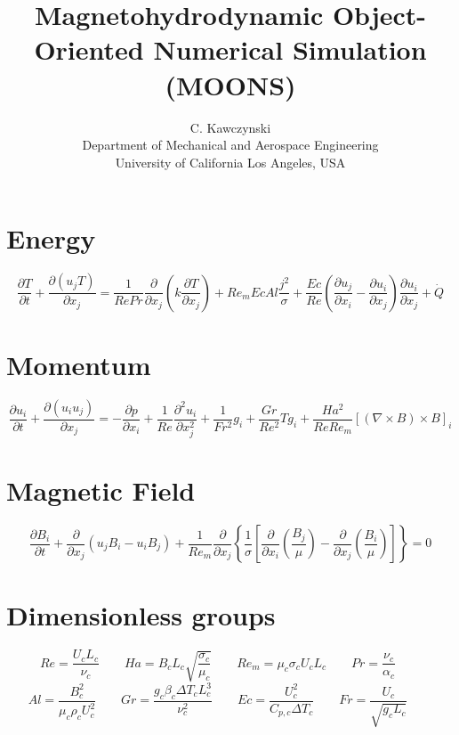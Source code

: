 \documentclass[11pt]{article}
\begin{document}
\doublespacing
\title{Magnetohydrodynamic Object-Oriented Numerical Simulation (MOONS)}
\author{C. Kawczynski \\
Department of Mechanical and Aerospace Engineering \\
University of California Los Angeles, USA\\}
\section{Energy}
\Large
\begin{equation}
	\frac{\partial T}{\partial t} +
	\frac{\partial (u_j T)}{\partial x_j}
	= 
	\frac{1}{Re Pr}
	\frac{\partial}{\partial x_j}
	\left( 
	k \frac{\partial T}{\partial x_j}
	\right) + 
	Re_m Ec Al
	\frac{{j}^2}{\sigma} +
	\frac{Ec}{Re}
	\left(
	\frac{\partial u_j}{\partial x_i}
	-
	\frac{\partial u_i}{\partial x_j}
	\right)
	\frac{\partial u_i}{\partial x_j} +
	\dot{Q}
\end{equation}
\section{Momentum}
\begin{equation}
	\frac{\partial u_i}{\partial t} + 
	\frac{\partial (u_i u_j)}{\partial x_j}
	= 
	- \frac{\partial p}{\partial x_i}
	+ \frac{1}{Re}
	\frac{\partial^2 u_i}{\partial x_j^2}
	+ \frac{1}{Fr^2}
	g_i
	+ \frac{Gr}{Re^2}
	T g_i
	+ \frac{Ha^2}{Re Re_m}
	[(\nabla \times B) \times B]_i
\end{equation}
\section{Magnetic Field}
\begin{equation}
	\frac{\partial B_i}{\partial t} 
	+ \frac{\partial}{\partial x_j} (u_j B_i - u_i B_j) 
	+ \frac{1}{Re_m}
	\frac{\partial}{\partial x_j} 
	\left\{ \frac{1}{\sigma} 
	\left[ 
	\frac{\partial}{\partial x_i} 
	\left( \frac{B_j}{\mu} \right) - 
	\frac{\partial}{\partial x_j} 
	\left( \frac{B_i}{\mu} \right)
	\right]
	\right\} = 0
\end{equation}

\section{Dimensionless groups}
\begin{equation}
	Re = \frac{U_c L_c}{\nu_c} \qquad
	Ha = B_c L_c \sqrt{\frac{\sigma_c}{\mu_c}} \qquad
	Re_m = \mu_c \sigma_c U_c L_c \qquad
	Pr = \frac{\nu_c}{\alpha_c} \qquad
\end{equation}
\begin{equation}
	Al = \frac{B_c^2}{\mu_c \rho_c U_c^2} \qquad
	Gr = \frac{g_c \beta_c \Delta T_c L_c^3}{\nu_c^2} \qquad
	Ec = \frac{U_c^2}{C_{p,c} \Delta T_c} \qquad
	Fr = \frac{U_c}{\sqrt{g_c L_c}} \qquad
\end{equation}
\end{document}
